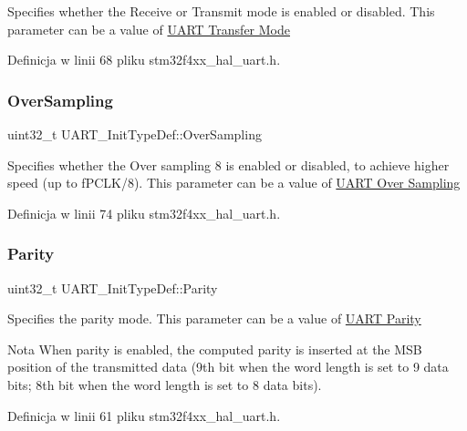 Specifies whether the Receive or Transmit mode is enabled or disabled. This parameter can be a value of \hyperlink{group___u_a_r_t___mode}{U\+A\+RT Transfer Mode} 

Definicja w linii 68 pliku stm32f4xx\+\_\+hal\+\_\+uart.\+h.

\mbox{\label{struct_u_a_r_t___init_type_def_a77c2c86a2186e09cbf022e27c0c82324}} 
\subsubsection{\texorpdfstring{Over\+Sampling}{OverSampling}}
{\footnotesize\ttfamily uint32\+\_\+t U\+A\+R\+T\+\_\+\+Init\+Type\+Def\+::\+Over\+Sampling}

Specifies whether the Over sampling 8 is enabled or disabled, to achieve higher speed (up to f\+P\+C\+L\+K/8). This parameter can be a value of \hyperlink{group___u_a_r_t___over___sampling}{U\+A\+RT Over Sampling} 

Definicja w linii 74 pliku stm32f4xx\+\_\+hal\+\_\+uart.\+h.

\mbox{\label{struct_u_a_r_t___init_type_def_adc92243425cb18cb8b5f03692841db48}} 
\subsubsection{\texorpdfstring{Parity}{Parity}}
{\footnotesize\ttfamily uint32\+\_\+t U\+A\+R\+T\+\_\+\+Init\+Type\+Def\+::\+Parity}

Specifies the parity mode. This parameter can be a value of \hyperlink{group___u_a_r_t___parity}{U\+A\+RT Parity} \begin{DoxyNote}{Nota}
When parity is enabled, the computed parity is inserted at the M\+SB position of the transmitted data (9th bit when the word length is set to 9 data bits; 8th bit when the word length is set to 8 data bits). 
\end{DoxyNote}


Definicja w linii 61 pliku stm32f4xx\+\_\+hal\+\_\+uart.\+h.

